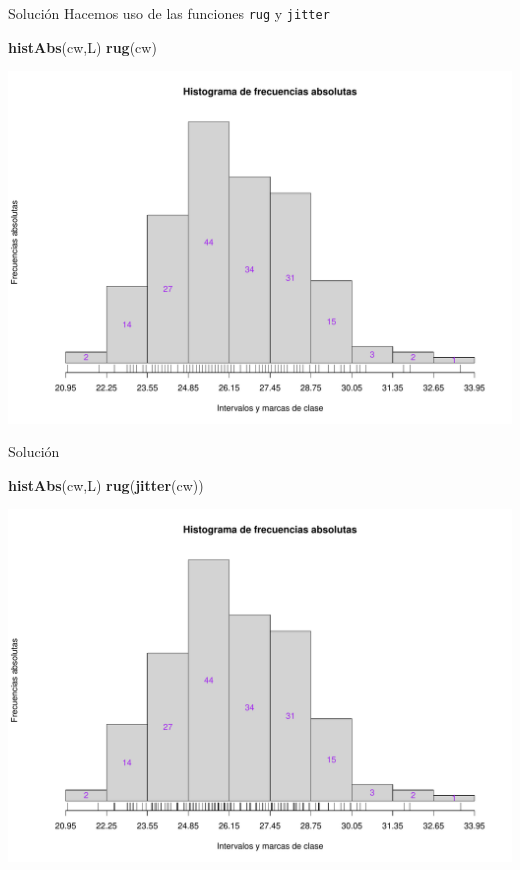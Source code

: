 \documentclass[
  ignorenonframetext,
]{beamer}
\newenvironment{Shaded}{\begin{snugshade}}{\end{snugshade}}
\newcommand{\FunctionTok}[1]{\textcolor[rgb]{0.13,0.29,0.53}{\textbf{#1}}}
\newcommand{\NormalTok}[1]{#1}
\begin{document}
\begin{frame}[fragile]{Solución}
\label{soluciuxf3n-41}
Hacemos uso de las funciones \texttt{rug} y \texttt{jitter}

\begin{Shaded}
\begin{Highlighting}[]
\FunctionTok{histAbs}\NormalTok{(cw,L)}
\FunctionTok{rug}\NormalTok{(cw)}
\end{Highlighting}
\end{Shaded}

\includegraphics{R_base_files/figure-beamer/unnamed-chunk-248-1.pdf}
\end{frame}

\begin{frame}[fragile]{Solución}
\label{soluciuxf3n-42}
\begin{Shaded}
\begin{Highlighting}[]
\FunctionTok{histAbs}\NormalTok{(cw,L)}
\FunctionTok{rug}\NormalTok{(}\FunctionTok{jitter}\NormalTok{(cw))}
\end{Highlighting}
\end{Shaded}

\includegraphics{R_base_files/figure-beamer/unnamed-chunk-249-1.pdf}
\end{frame}
\end{document}

